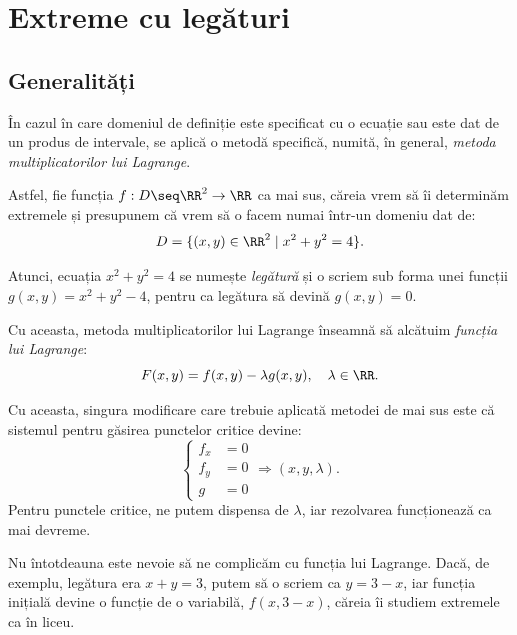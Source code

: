 
\chapter{Extreme cu legături}

\section{Generalități}

În cazul în care domeniul de definiție este specificat cu o ecuație sau este
dat de un produs de intervale, se aplică o metodă specifică, numită, în general,
\emph{metoda multiplicatorilor lui Lagrange}.

Astfel, fie funcția $ f : D \seq \RR^2 \to \RR $ ca mai sus, căreia vrem să îi determinăm
extremele și presupunem că vrem să o facem numai într-un domeniu dat de:
\[
  D = \{ (x, y) \in \RR^2 \mid x^2 + y^2 = 4 \}.
\]

Atunci, ecuația $ x^2 + y^2 = 4 $ se numește \emph{legătură} și o scriem sub
forma unei funcții $ g(x, y) = x^2 + y^2 - 4 $, pentru ca legătura să devină
$ g(x, y) = 0 $.

Cu aceasta, metoda multiplicatorilor lui Lagrange înseamnă să alcătuim
\emph{funcția lui Lagrange}\footnotemark:
\[
  F(x, y) = f(x, y) - \lambda g(x, y), \quad \lambda \in \RR.
\]

Cu aceasta, singura modificare care trebuie aplicată metodei de mai sus este
că sistemul pentru găsirea punctelor critice devine:
\[
  \begin{cases}
    f_x &= 0 \\
    f_y &= 0 \\
    g &= 0
  \end{cases} \Longrightarrow (x, y, \lambda).
\]
Pentru punctele critice, ne putem dispensa de $ \lambda $, iar rezolvarea funcționează
ca mai devreme.

\begin{remark}\label{rk:leg-simpla}
  Nu întotdeauna este nevoie să ne complicăm cu funcția lui Lagrange.
  Dacă, de exemplu, legătura era $ x + y = 3 $, putem să o scriem ca $ y = 3 - x $,
  iar funcția inițială devine o funcție de o variabilă, $ f(x, 3 - x) $,
  căreia îi studiem extremele ca în liceu.
\end{remark}


